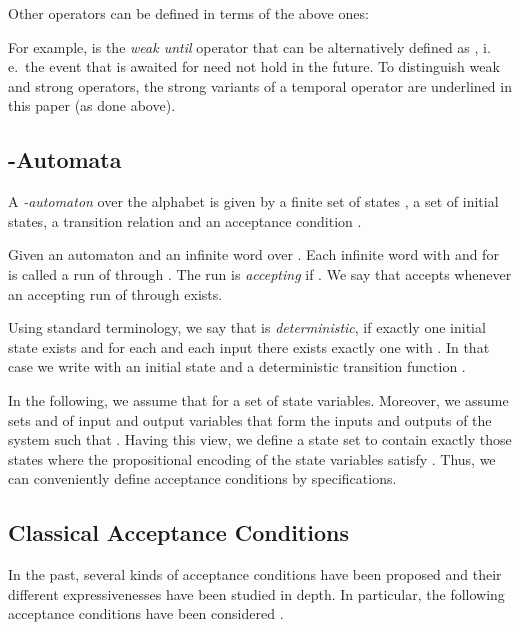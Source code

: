 \documentclass[submission,copyright,creativecommons]{eptcs}
\newcommand{\ie}{i.\,e.~}
\begin{document}
Other operators can be defined in terms of the above ones:


\noindent For example,  is the \emph{weak until} operator that can be alternatively defined as , \ie the event  that is awaited for need not hold in the future. To distinguish weak and strong operators, the strong variants of a temporal operator are underlined in this paper (as done above).


\subsection{\texorpdfstring{-Automata}{omega-Automata}}

\begin{definition}[-Automata ]
A \emph{-automaton}  over the alphabet  is given by a finite set of states , a set  of initial states, a transition relation  and an acceptance condition .
\end{definition}

Given an automaton  and an infinite word  over . Each infinite word  with  and  for  is called a run of  through . The run is \emph{accepting} if . We say that  accepts  whenever an accepting run of  through  exists.

Using standard terminology, we say that  is \emph{deterministic}, if exactly one initial state exists and for each  and each input  there exists exactly one  with  . In that case we write  with an initial state  and a deterministic transition function .
 
In the following, we assume that  for a set  of state variables. Moreover, we assume sets  and  of input and output variables that form the inputs  and outputs  of the system such that . Having this view, we define a state set  to contain exactly those states where the propositional encoding of the state variables  satisfy . Thus, we can conveniently define acceptance conditions by \LTL{} specifications.

\subsection{Classical Acceptance Conditions}

In the past, several kinds of acceptance conditions have been proposed and their different expressivenesses have been studied in depth. In particular, the following acceptance conditions have been considered \cite{Wagn79,Thom90a,Schn03}.
\end{document}
